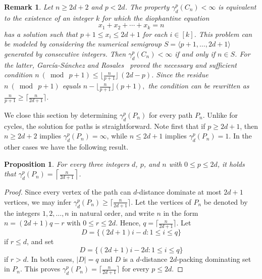 \documentclass[12pt]{article}
\newtheorem{proposition}[theorem]{Proposition}
\newtheorem{remark}[theorem]{Remark}
\begin{document}
\begin{remark}
\label{rem:Daniel}
  Let $n \ge 2d+2$ and $p <2d$. 
  The property $\gamma_d^p(C_n) <\infty$ is equivalent to the existence of an integer $k$ for which the diophantine equation 
  $$ x_1+x_2 + \cdots + x_k=n
  $$
  has a solution such that $p+1 \le x_i \le 2d+1$ for each $i \in [k]$. This problem can be modeled by considering the numerical semigroup $S=\langle p+1, \dots, 2d+1\rangle$ generated by consecutive integers. Then $\gamma_d^p(C_n) <\infty$ if and only if $n \in S$. For the latter, Garc\' ia-S\' anchez and Rosales~\cite[Corollary 2]{Garcia} proved the necessary and sufficient condition $n\ (\bmod\ p+1) \leq \lfloor \frac{n}{p+1} \rfloor \, (2d-p)$. Since the residue $n\ (\bmod\ p+1)$   equals $n - \lfloor\frac{n}{p+1} \rfloor(p+1),$
  the condition can be rewritten as $\frac{n}{p+1} \ge \lceil\frac{n}{2d+1} \rceil$.
\end{remark}

We close this section by determining $\gamma_d^p(P_n)$ for every path $P_n$. Unlike for cycles, the solution for paths is straightforward. Note first that if $p \ge 2d+1$, then $n \ge 2d+2$ implies $\gamma_d^p(P_n)=\infty$, while $n \le 2d+1$ implies $\gamma_d^p(P_n) = 1$. In the other cases we have the following result. 

\begin{proposition} \label{prop:path}
    For every three integers $d$, $p$, and $n$ with $0 \le p \le 2d$, it holds that $\gamma_d^p(P_n)= \left\lceil\frac{n}{2d+1}\right\rceil$.
\end{proposition}
\begin{proof}
   Since every vertex of the path can $d$-distance dominate at most $2d+1$ vertices, we may infer $\gamma_d^p(P_n)\ge  \lceil\frac{n}{2d+1}\rceil$. Let the vertices of $P_n$ be denoted by the integers $1,2,\dots, n$ in natural order, and write $n$ in the form $n=(2d+1)q -r $ with $0 \le r \le 2d $. Hence, $q= \lceil\frac{n}{2d+1}\rceil$. Let 
   $$D= \{(2d+1)i-d \colon 1 \le i \le q\}$$
   if $r \leq d$, and set 
   $$D= \{(2d+1)i-2d \colon 1 \le i \le q \} $$  if $r > d$. In both cases, $|D|=q$ and $D$ is a $d$-distance $2d$-packing dominating set in $P_n$. This proves $\gamma_d^p(P_n)= \lceil\frac{n}{2d+1}\rceil$ for every $p \leq 2d$.
\end{proof}



 
\end{document}
